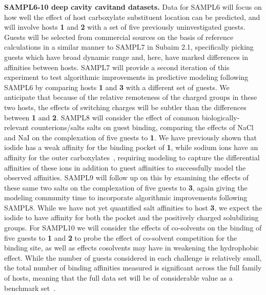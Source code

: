 \documentclass[11pt]{article}
\begin{document}
{\bf SAMPL6-10 deep cavity cavitand datasets.} 
Data for SAMPL6 will focus on how well the effect of host carboxylate substituent location can be predicted, and will involve hosts {\bf 1} and {\bf 2} with a set of five previously uninvestigated guests.  
Guests will be selected from commercial sources on the basis of reference calculations in a similar manner to SAMPL7 in Subaim 2.1, specifically picking guests which have broad dynamic range and, here, have marked differences in affinities between hosts.
SAMPL7 will provide a second iteration of this experiment to test algorithmic improvements in predictive modeling following SAMPL6 by comparing hosts {\bf 1} and {\bf 3} with a different set of guests.  
We anticipate that because of the relative remoteness of the charged groups in these two hosts, the effects of switching charges will be subtler than the differences between {\bf 1} and {\bf 2}.  
SAMPL8 will consider the effect of common biologically-relevant counterions/salts salts on guest binding, comparing the effects of NaCl and NaI on the complexation of five guests to {\bf 1}.  
We have previously shown that iodide has a weak affinity for the binding pocket of {\bf 1}, while sodium ions have an affinity for the outer carboxylates~\cite{carnegie_anion_2014}, requiring modeling to capture the differential affinities of these ions in addition to guest affinities to successfully model the observed affinities.  
SAMPL9 will follow up on this by examining the effects of these same two salts on the complexation of five guests to {\bf 3}, again giving the modeling community time to incorporate algorithmic improvements following SAMPL8. 
While we have not yet quantified salt affinities to host {\bf 3}, we expect the iodide to have affinity for both the pocket and the positively charged solubilizing groups.  
For SAMPL10 we will consider the effects of co-solvents on the binding of five guests to {\bf 1} and {\bf 2} to probe the effect of co-solvent competition for the binding site, as well as effects cosolvents may have in weakening the hydrophobic effect. 
While the number of guests considered in each challenge is relatively small, the total number of binding affinities measured is significant across the full family of hosts, meaning that the full data set will be of considerable value as a benchmark set~\cite{mobley_predicting_2016}. 
\end{document}
